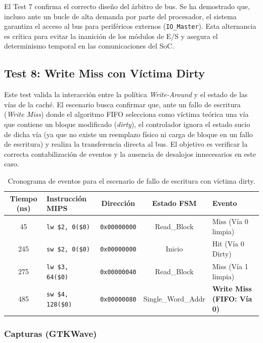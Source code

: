 \documentclass[12pt,a4paper]{article}
\begin{document}
El Test 7 confirma el correcto diseño del árbitro de bus. Se ha demostrado que, incluso ante un bucle de alta demanda por parte del procesador, el sistema garantiza el acceso al bus para periféricos externos (\texttt{IO\_Master}). Esta alternancia es crítica para evitar la inanición de los módulos de E/S y asegura el determinismo temporal en las comunicaciones del SoC.

\subsection{Test 8: Write Miss con Víctima Dirty}

Este test valida la interacción entre la política \textit{Write-Around} y el estado de las vías de la caché. El escenario busca confirmar que, ante un fallo de escritura (\textit{Write Miss}) donde el algoritmo FIFO selecciona como víctima teórica una vía que contiene un bloque modificado (\textit{dirty}), el controlador ignora el estado sucio de dicha vía (ya que no existe un reemplazo físico ni carga de bloque en un fallo de escritura) y realiza la transferencia directa al bus. El objetivo es verificar la correcta contabilización de eventos y la ausencia de desalojos innecesarios en este caso.

\begin{table}[H]
\centering
\small
\renewcommand{\arraystretch}{1.2}
\begin{tabular}{|c|l|c|c|l|}
\hline
\rowcolor[HTML]{EFEFEF} 
\textbf{Tiempo (ns)} & \textbf{Instrucción MIPS} & \textbf{Dirección} & \textbf{Estado FSM} & \textbf{Evento} \\ \hline
45  & \texttt{lw \$2, 0(\$0)}    & \texttt{0x00000000} & Read\_Block        & Miss (Vía 0 limpia) \\ \hline
245 & \texttt{sw \$2, 0(\$0)}    & \texttt{0x00000000} & Inicio             & Hit (Vía 0 Dirty)  \\ \hline
275 & \texttt{lw \$3, 64(\$0)}   & \texttt{0x00000040} & Read\_Block        & Miss (Vía 1 limpia) \\ \hline
485 & \texttt{sw \$4, 128(\$0)}  & \texttt{0x00000080} & Single\_Word\_Addr & \textbf{Write Miss (FIFO: Vía 0)} \\ \hline
\end{tabular}
\caption{Cronograma de eventos para el escenario de fallo de escritura con víctima dirty.}
\end{table}

\subsubsection{Capturas (GTKWave)}
\end{document}

